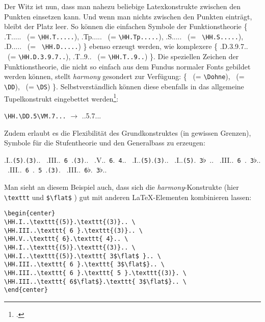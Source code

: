 Der Witz ist nun, dass man nahezu beliebige Latexkonstrukte zwischen den Punkten
einsetzen kann. Und wenn man nichts zwischen den Punkten einträgt, bleibt der
Platz leer. So können die einfachen Symbole der Funktionstheorie \{ \HH.T..... 
\ (= \texttt{\small \textbackslash{HH.T.....}}), \HH.Tp.....  \ (=
\texttt{\small \textbackslash{HH.Tp.....}}), \HH.S.....  \ (= \texttt{\small
\textbackslash{HH.S.....}}), \HH.D.....  \ (= \texttt{\small
\textbackslash{HH.D.....}}) \} ebenso erzeugt werden, wie komplexere \{
\HH.D.3.9.7..  \ (= \texttt{\small \textbackslash{HH.D.3.9.7..}}),
\HH.T..9..  \ (= \texttt{\small \textbackslash{HH.T..9..}}) \}.
Die speziellen Zeichen der Funktionstheorie, die nicht so einfach aus dem Fundus
normaler Fonts gebildet werden können, stellt  \emph{harmony} gesondert zur
Verfügung:
\{ \Dohne  \ (= \texttt{\small \textbackslash{Dohne}}), \DD \ (= \texttt{\small
\textbackslash{DD}}), \DS  \ (= \texttt{\small \textbackslash{DS}}) \}.
Selbstverständlich können diese ebenfalls in das allgemeine Tupelkonstrukt
eingebettet werden\footcite[Vgl. dazu][6]{WegWeg2007a}:
\begin{center}
 \texttt{\textbackslash{HH}.\textbackslash{DD}.5\textbackslash{VM}.7...} 
 $\rightarrow$ \HH.\DD.5\VM.7...
\end{center}

Zudem erlaubt es die Flexibilität des Grundkonstruktes (in gewissen Grenzen),
Symbole für die Stufentheorie und den Generalbass zu erzeugen:

\begin{center}
\HH.I..\texttt{(5)}.\texttt{(3)}.. \ 
\HH.III..\texttt{ 6 }.\texttt{(3)}.. \ 
\HH.V..\texttt{ 6}.\texttt{ 4}.. \ 
\HH.I..\texttt{(5)}.\texttt{(3)}.. \ 
\HH.I..\texttt{(5)}.\texttt{ 3$\flat$ }.. \ 
\HH.III..\texttt{ 6 }.\texttt{ 3$\flat$}.. \ 
\HH.III..\texttt{ 6 }.\texttt{ 5 }.\texttt{(3)}. \ 
\HH.III..\texttt{ 6$\flat$}.\texttt{ 3$\flat$}.. \ 
\end{center}

Man sieht an diesem Beispiel auch, dass sich die \emph{harmony}-Konstrukte (hier
\texttt{\textbackslash{texttt}} und \texttt{\$\textbackslash{flat}\$} ) gut mit
anderen \LaTeX-Elementen kombinieren lassen:
\begin{verbatim}
\begin{center}
\HH.I..\texttt{(5)}.\texttt{(3)}.. \ 
\HH.III..\texttt{ 6 }.\texttt{(3)}.. \ 
\HH.V..\texttt{ 6}.\texttt{ 4}.. \ 
\HH.I..\texttt{(5)}.\texttt{(3)}.. \ 
\HH.I..\texttt{(5)}.\texttt{ 3$\flat$ }.. \ 
\HH.III..\texttt{ 6 }.\texttt{ 3$\flat$}.. \ 
\HH.III..\texttt{ 6 }.\texttt{ 5 }.\texttt{(3)}. \ 
\HH.III..\texttt{ 6$\flat$}.\texttt{ 3$\flat$}.. \ 
\end{center}
\end{verbatim}

